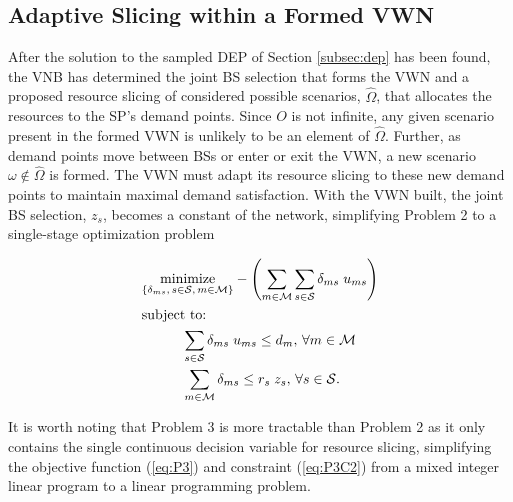 \documentclass[conference]{IEEEtran}
\begin{document}
\subsection{Adaptive Slicing within a Formed VWN} \label{subsec:slice}

After the solution to the sampled DEP of Section \ref{subsec:dep} has been found, the VNB has determined the joint BS selection that forms the VWN and a proposed resource slicing of considered possible scenarios, $\hat{\Omega}$, that allocates the resources to the SP's demand points.  Since $O$ is not infinite, any given scenario present in the formed VWN is unlikely to be an element of $\hat{\Omega}$.  Further, as demand points move between BSs or enter or exit the VWN, a new scenario $\omega \notin \hat{\Omega}$ is formed.  The VWN must adapt its resource slicing to these new demand points to maintain maximal demand satisfaction.  With the VWN built, the joint BS selection, $z_s$, becomes a constant of the network, simplifying Problem 2 to a single-stage optimization problem

\vspace{3mm}
\begin{tcolorbox}[title = Problem 3 (Deterministic Adaptive Slicing)]
\begin{align}
& 
\underset{\left\{ \substack{
	\delta_{ms},\,	s \in \mathcal{S},\, m \in \mathcal{M}} \right\}} {\text{minimize}}
- \left( \sum_{m \in \mathcal{M}} \sum_{s \in \mathcal{S}} \delta_{ms} \; u_{ms} \right) \label{eq:P3}\\
& \text{subject to:}  \nonumber \\
& \hspace{0.4in} \sum_{s \in \mathcal{S}} \delta_{ms} \; u_{ms} \leq d_m,\, \forall m \in \mathcal{M} \label{eq:P3C1}\\
& \hspace{0.4in} \sum_{m \in \mathcal{M}} \delta_{ms} \leq r_s \; z_s,\, \forall s \in \mathcal{S}. \label{eq:P3C2}
\end{align}
\end{tcolorbox}
\vspace{3mm}

It is worth noting that Problem 3 is more tractable than Problem 2 as it only contains the single continuous decision variable for resource slicing, simplifying the objective function (\ref{eq:P3}) and constraint (\ref{eq:P3C2}) from a mixed integer linear program to a linear programming problem.

\end{document}
